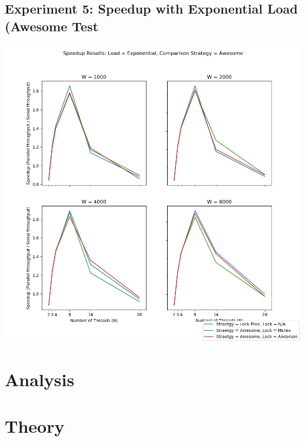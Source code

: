 \documentclass[]{article}
\begin{document}
\subsection{Experiment 5: Speedup with Exponential Load (Awesome Test}
\includegraphics[scale=0.5]{graphs/speedup_f:A.png}\\

\section{Analysis}

\section{Theory}
	
\end{document}
